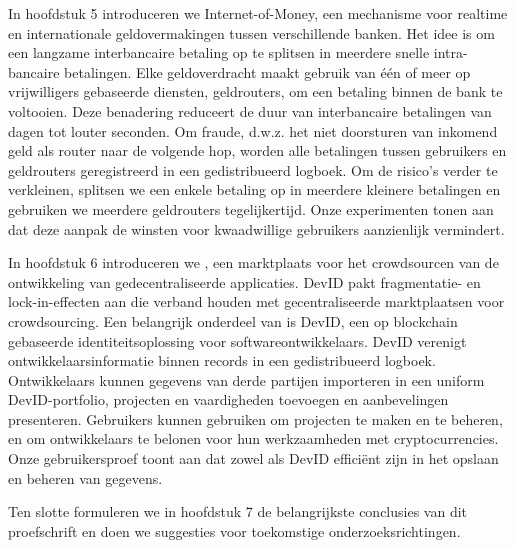 {In hoofdstuk 5 introduceren we Internet-of-Money, een mechanisme voor realtime en internationale geldovermakingen tussen verschillende banken.
Het idee is om een ​​langzame interbancaire betaling op te splitsen in meerdere snelle intra-bancaire betalingen.
Elke geldoverdracht maakt gebruik van één of meer op vrijwilligers gebaseerde diensten, geldrouters, om een ​​betaling binnen de bank te voltooien.
Deze benadering reduceert de duur van interbancaire betalingen van dagen tot louter seconden.
Om fraude, d.w.z. het niet doorsturen van inkomend geld als router naar de volgende hop, worden alle betalingen tussen gebruikers en geldrouters geregistreerd in een gedistribueerd logboek.
Om de risico's verder te verkleinen, splitsen we een enkele betaling op in meerdere kleinere betalingen en gebruiken we meerdere geldrouters tegelijkertijd.
Onze experimenten tonen aan dat deze aanpak de winsten voor kwaadwillige gebruikers aanzienlijk vermindert.

In hoofdstuk 6 introduceren we \Dappcoder{}, een marktplaats voor het crowdsourcen van de ontwikkeling van gedecentraliseerde applicaties.
DevID pakt fragmentatie- en lock-in-effecten aan die verband houden met gecentraliseerde marktplaatsen voor crowdsourcing.
Een belangrijk onderdeel van \Dappcoder{} is DevID, een op blockchain gebaseerde identiteitsoplossing voor softwareontwikkelaars.
DevID verenigt ontwikkelaarsinformatie binnen records in een gedistribueerd logboek.
Ontwikkelaars kunnen gegevens van derde partijen importeren in een uniform DevID-portfolio, projecten en vaardigheden toevoegen en aanbevelingen presenteren.
Gebruikers kunnen \Dappcoder{} gebruiken om projecten te maken en te beheren, en om ontwikkelaars te belonen voor hun werkzaamheden met cryptocurrencies.
Onze gebruikersproef toont aan dat zowel \Dappcoder{} als DevID efficiënt zijn in het opslaan en beheren van gegevens.

Ten slotte formuleren we in hoofdstuk 7 de belangrijkste conclusies van dit proefschrift en doen we suggesties voor toekomstige onderzoeksrichtingen.
}



